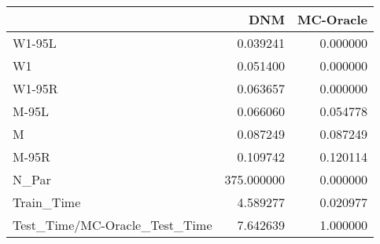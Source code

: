\begin{tabular}{lrr}
\toprule
{} &         DNM &  MC-Oracle \\
\midrule
W1-95L                        &    0.039241 &   0.000000 \\
W1                            &    0.051400 &   0.000000 \\
W1-95R                        &    0.063657 &   0.000000 \\
M-95L                         &    0.066060 &   0.054778 \\
M                             &    0.087249 &   0.087249 \\
M-95R                         &    0.109742 &   0.120114 \\
N\_Par                         &  375.000000 &   0.000000 \\
Train\_Time                    &    4.589277 &   0.020977 \\
Test\_Time/MC-Oracle\_Test\_Time &    7.642639 &   1.000000 \\
\bottomrule
\end{tabular}

